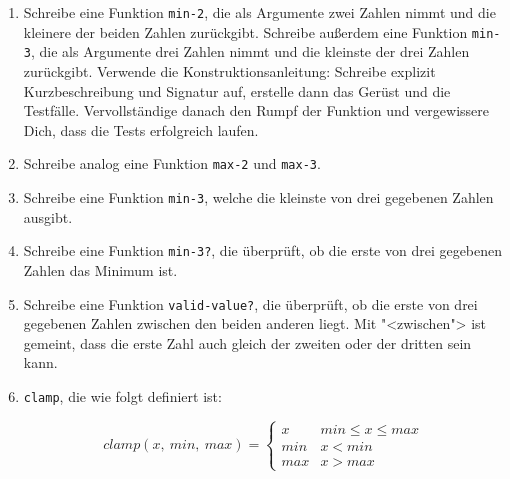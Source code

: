 \begin{aufgabe}

  \begin{enumerate}

  \item Schreibe eine Funktion \lstinline{min-2}, die als Argumente zwei
    Zahlen nimmt und die kleinere der beiden Zahlen zurückgibt.  Schreibe
    außerdem eine Funktion \lstinline{min-3}, die als Argumente drei
    Zahlen nimmt und die kleinste der drei Zahlen zurückgibt.  Verwende
    die Konstruktionsanleitung: Schreibe
    explizit Kurzbeschreibung und Signatur auf, erstelle dann das
    Gerüst und die Testfälle.  Vervollständige danach den Rumpf der
    Funktion und vergewissere Dich, dass die Tests erfolgreich laufen.
    
  \item Schreibe analog eine Funktion \lstinline{max-2} und \lstinline{max-3}.
    
  \item Schreibe eine Funktion \lstinline{min-3}, welche die kleinste von drei
    gegebenen Zahlen ausgibt.
  \item Schreibe eine Funktion \lstinline{min-3?}, die überprüft, ob die erste
    von drei gegebenen Zahlen das Minimum ist.
  \item Schreibe eine Funktion \lstinline{valid-value?}, die überprüft, ob die erste von
    drei gegebenen Zahlen zwischen den beiden anderen liegt.  Mit
    "<zwischen"> ist gemeint, dass die erste Zahl auch gleich der
    zweiten oder der dritten sein kann.
  \item \lstinline{clamp}, die wie folgt definiert ist:
    
    \[\mathit{clamp}(x,\ \mathit{min},\ \mathit{max})=
    \begin{cases} 
      x & \mathit{min} \leq x \leq \mathit{max}\\ 
      \mathit{min} & x < \mathit{min} \\ 
      \mathit{max} & x > \mathit{max}
    \end{cases}
    \]
    
  \end{enumerate}
\end{aufgabe}

